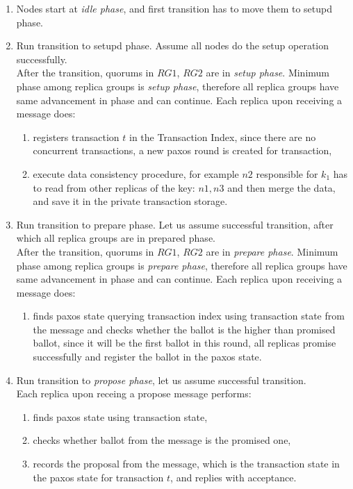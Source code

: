 \begin{enumerate}
\item Nodes start at \emph{idle phase}, and first transition has to move them to setupd phase.

\item Run transition to setupd phase. Assume all nodes do the setup operation successfully. \\
 After the transition, quorums in $RG1$, $RG2$ are in \emph{setup phase}. Minimum phase among replica groups is \emph{setup phase}, therefore all replica groups have same advancement in phase and can continue. Each replica upon receiving a message does:
 \begin{enumerate}
 	\item registers transaction $t$ in the Transaction Index, since there are no concurrent transactions, a new paxos round is created for transaction,
 	\item execute data consistency procedure, for example $n2$ responsible for $k_{1}$ has to read from other replicas of the key: $n1, n3$ and then merge the data, and save it in the private transaction storage.
 \end{enumerate}

\item Run transition to prepare phase. Let us assume successful transition, after which all replica groups are in prepared phase. \\
  After the transition, quorums in $RG1$, $RG2$ are in \emph{prepare phase}. Minimum phase among replica groups is \emph{prepare phase}, therefore all replica groups have same advancement in phase and can continue. Each replica upon receiving a message does:

  \begin{enumerate}
  	\item finds paxos state querying transaction index using transaction state from the message and checks whether the ballot is the higher than promised ballot, since it will be the first ballot in this round, all replicas promise successfully and register the ballot in the paxos state.
  \end{enumerate}

\item Run transition to \emph{propose phase}, let us assume successful transition. \\
	Each replica upon receing a propose message performs:

	\begin{enumerate}
		\item finds paxos state using transaction state,
		\item checks whether ballot from the message is the promised one,
		\item records the proposal from the message, which is the transaction state in the paxos state for transaction $t$, and replies with acceptance.
	\end{enumerate}


\end{enumerate}
